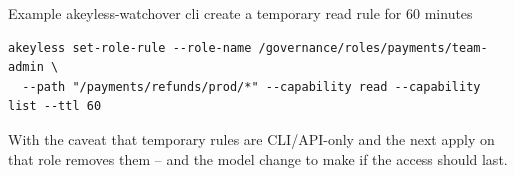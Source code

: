 \begin{session}{Example}
\you akeyless-watchover cli create a temporary read rule for 60 minutes

\agent \begin{lstlisting}
akeyless set-role-rule --role-name /governance/roles/payments/team-admin \
  --path "/payments/refunds/prod/*" --capability read --capability list --ttl 60
\end{lstlisting}
With the caveat that temporary rules are CLI/API-only and the next apply on that role removes
them -- and the model change to make if the access should last.
\end{session}
